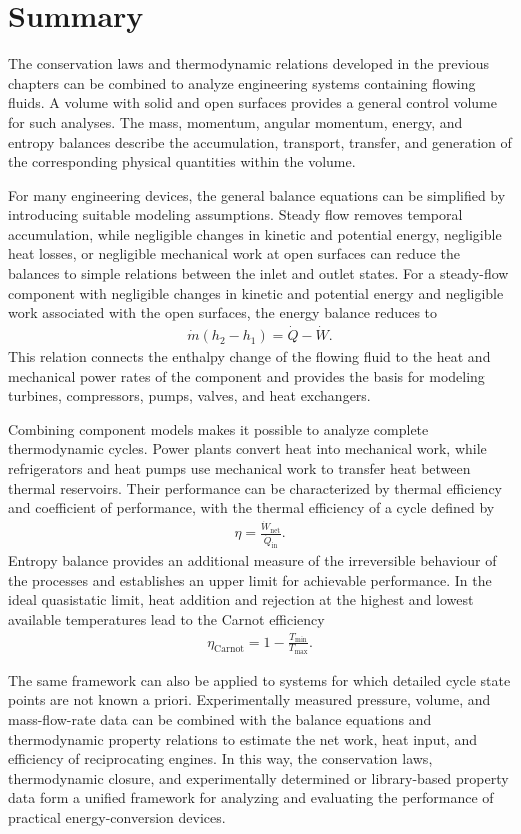 \section{Summary}

The conservation laws and thermodynamic relations developed in the
previous chapters can be combined to analyze engineering systems
containing flowing fluids. A volume with solid and open surfaces provides
a general control volume for such analyses. The mass, momentum, angular
momentum, energy, and entropy balances describe the accumulation,
transport, transfer, and generation of the corresponding physical
quantities within the volume.

For many engineering devices, the general balance equations can be
simplified by introducing suitable modeling assumptions. Steady flow
removes temporal accumulation, while negligible changes in kinetic and
potential energy, negligible heat losses, or negligible mechanical work
at open surfaces can reduce the balances to simple relations between the
inlet and outlet states. For a steady-flow component with negligible
changes in kinetic and potential energy and negligible work associated
with the open surfaces, the energy balance reduces to
\begin{align}
    \dot{m}(h_2-h_1) = \dot{Q}-\dot{W}.
\end{align}
This relation connects the enthalpy change of the flowing fluid to the
heat and mechanical power rates of the component and provides the basis
for modeling turbines, compressors, pumps, valves, and heat exchangers.

Combining component models makes it possible to analyze complete
thermodynamic cycles. Power plants convert heat into mechanical work,
while refrigerators and heat pumps use mechanical work to transfer heat
between thermal reservoirs. Their performance can be characterized by
thermal efficiency and coefficient of performance, with the thermal
efficiency of a cycle defined by
\begin{align}
    \eta = \frac{\dot{W}_{\mathrm{net}}}{\dot{Q}_{\mathrm{in}}}.
\end{align}
Entropy balance provides an additional measure of the irreversible
behaviour of the processes and establishes an upper limit for achievable
performance. In the ideal quasistatic limit, heat addition and rejection
at the highest and lowest available temperatures lead to the Carnot
efficiency
\begin{align}
    \eta_{\mathrm{Carnot}}
    = 1-\frac{T_{\min}}{T_{\max}}.
\end{align}

The same framework can also be applied to systems for which detailed
cycle state points are not known a priori. Experimentally measured
pressure, volume, and mass-flow-rate data can be combined with the
balance equations and thermodynamic property relations to estimate the
net work, heat input, and efficiency of reciprocating engines. In this
way, the conservation laws, thermodynamic closure, and experimentally
determined or library-based property data form a unified framework for
analyzing and evaluating the performance of practical energy-conversion
devices.